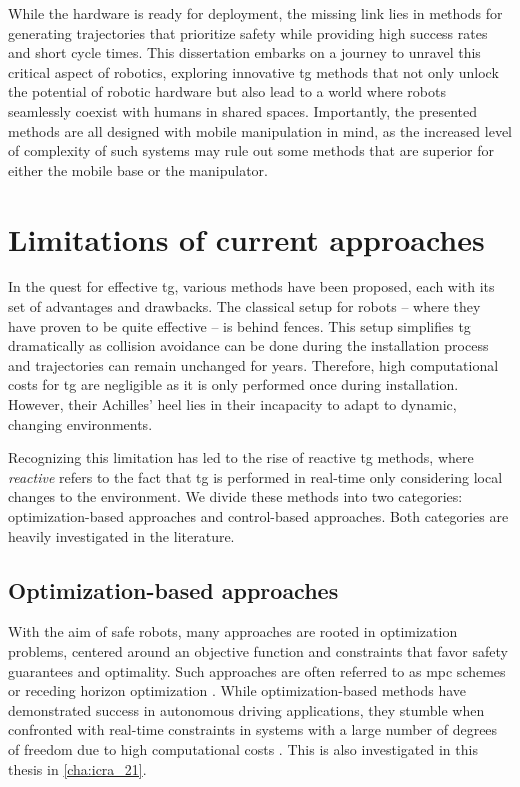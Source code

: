 While the hardware is ready for deployment, the
missing link lies in methods for generating trajectories
that prioritize safety while providing high success rates
and short cycle times.
This dissertation embarks on a journey to unravel this
critical aspect of robotics, exploring innovative \ac{tg}
methods that not only unlock the potential of
robotic hardware but also lead to a world where robots
seamlessly coexist with humans in shared spaces.
Importantly, the presented methods are all designed with
mobile manipulation in mind, as the increased level of
complexity of such systems may rule out some methods that
are superior for either the mobile base or the manipulator.

\section{Limitations of current approaches}
\label{sec:limitations_of_current_approaches}

In the quest for effective \ac{tg}, various
methods have been proposed, each with its set of advantages and
drawbacks.
The classical setup for robots -- where they have
proven to be quite effective -- is behind fences. This setup
simplifies \ac{tg} dramatically as collision
avoidance can be done during the installation process and
trajectories can remain unchanged for years.
Therefore, high computational costs for
\ac{tg} are negligible as it is only performed
once during installation. However, their Achilles' heel lies
in their incapacity to adapt to dynamic, changing
environments.

Recognizing this limitation has led to the rise of reactive
\ac{tg} methods, where \textit{reactive} refers to the fact
that \ac{tg} is performed in real-time only considering
local changes to the environment.
We divide these methods into two categories: optimization-based
approaches and control-based approaches. Both categories
are heavily investigated in the literature.
%
%
%
\subsection*{Optimization-based approaches}
With the aim of safe robots, many approaches are
rooted in optimization problems, centered around an
objective function and constraints that favor safety
guarantees and optimality. Such approaches are often
referred to as \ac{mpc} schemes or receding
horizon optimization \cite{hewing2020learning}. While
optimization-based methods have demonstrated success in
autonomous driving applications, they stumble when
confronted with real-time constraints in systems with
a large number of degrees of freedom due to high computational costs
\cite{spahn2021coupled}. This is also investigated in this
thesis in \cref{cha:icra_21}.

